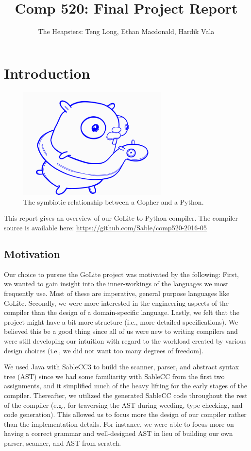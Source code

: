 \documentclass{article}
\title{Comp 520: Final Project Report}
\author{The Heapsters: Teng Long, Ethan Macdonald, Hardik Vala}
\date{}
\begin{document}
\maketitle

\section{Introduction}

\begin{figure}[h]
  \centering
  \includegraphics[width=7.5cm]{gopher_python.png}
  \caption{The symbiotic relationship between a Gopher and a Python.}
  \label{fig:gopher-python}
\end{figure}

\noindent This report gives an overview of our GoLite to Python compiler. The compiler source is available here: \href{https://github.com/Sable/comp520-2016-05}{https://github.com/Sable/comp520-2016-05}

\subsection{Motivation}
Our choice to pursue the GoLite project was motivated by the following: First, we wanted to gain insight into the inner-workings of the languages we most frequently use. Most of these are imperative, general purpose languages like GoLite. Secondly, we were more interested in the engineering aspects of the compiler than the design of a domain-specific language. Lastly, we felt that the project might have a bit more structure (i.e., more detailed specifications). We believed this be a good thing since all of us were new to writing compilers and were still developing our intuition with regard to the workload created by various design choices (i.e., we did not want too many degrees of freedom).

We used Java with SableCC3 to build the scanner, parser, and abstract syntax tree (AST) since we had some familiarity with SableCC from the first two assignments, and it simplified much of the heavy lifting for the early stages of the compiler. Thereafter, we utilized the generated SableCC code throughout the rest of the compiler (e.g., for traversing the AST during weeding, type checking, and code generation). This allowed us to focus more the design of our compiler rather than the implementation details. For instance, we were able to focus more on having a correct grammar and well-designed AST in lieu of building our own parser, scanner, and AST from scratch. 
\end{document}
